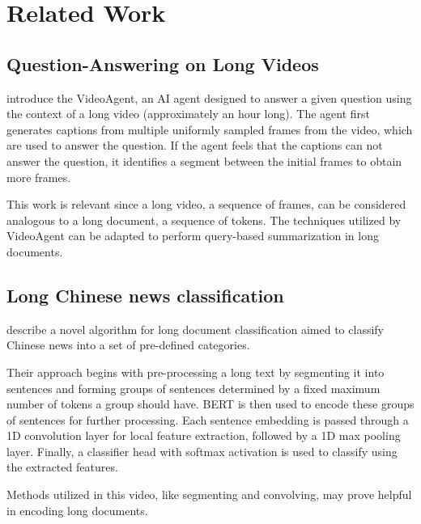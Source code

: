 \section{Related Work}
\label{sec:related-work}


\subsection*{Question-Answering on Long Videos}
\label{sub:long-videos}

\citet{wang2024videoagent} introduce the VideoAgent, an AI agent designed to answer a
given question using the context of a long video (approximately an hour long).
The agent first generates captions from multiple uniformly sampled frames from the
video, which are used to answer the question.
If the agent feels that the captions can not answer the question, it identifies a
segment between the initial frames to obtain more frames.

This work is relevant since a long video, a sequence of frames, can be considered
analogous to a long document, a sequence of tokens. The techniques utilized by
VideoAgent can be adapted to perform query-based summarization in long documents.


\subsection*{Long Chinese news classification}
\label{sub:chinese}

\citet{chen2022long} describe a novel algorithm for long document classification
aimed to classify Chinese news into a set of pre-defined categories.

Their approach begins with pre-processing a long text by segmenting it into sentences
and forming groups of sentences determined by a fixed maximum number of tokens a
group should have.
BERT is then used to encode these groups of sentences for further processing.
Each sentence embedding is passed through a 1D convolution layer for local feature
extraction, followed by a 1D max pooling layer.
Finally, a classifier head with softmax activation is used to classify using the
extracted features.

Methods utilized in this video, like segmenting and convolving, may prove helpful in
encoding long documents.
